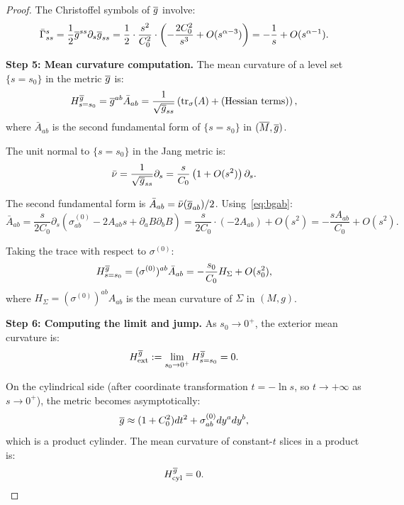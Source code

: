 \begin{proof}
The Christoffel symbols of $\overline{g}$ involve:
\begin{equation}\label{eq:Christoffel}
    \bar{\Gamma}^s_{ss} = \frac{1}{2}\overline{g}^{ss} \partial_s \overline{g}_{ss} = \frac{1}{2} \cdot \frac{s^2}{C_0^2} \cdot \left(-\frac{2C_0^2}{s^3} + O(s^{\alpha - 3})\right) = -\frac{1}{s} + O(s^{\alpha - 1}).
\end{equation}

\textbf{Step 5: Mean curvature computation.}
The mean curvature of a level set $\{s = s_0\}$ in the metric $\overline{g}$ is:
\begin{equation}\label{eq:MeanCurvatureDef}
    H^{\overline{g}}_{s=s_0} = \overline{g}^{ab} \bar{A}_{ab} = \frac{1}{\sqrt{\overline{g}_{ss}}} \left( \mathrm{tr}_\sigma(A) + \text{(Hessian terms)} \right),
\end{equation}
where $\bar{A}_{ab}$ is the second fundamental form of $\{s = s_0\}$ in $(\overline{M}, \overline{g})$.

The unit normal to $\{s = s_0\}$ in the Jang metric is:
\begin{equation}\label{eq:UnitNormal}
    \bar{\nu} = \frac{1}{\sqrt{\overline{g}_{ss}}} \partial_s = \frac{s}{C_0} \left(1 + O(s^2)\right) \partial_s.
\end{equation}

The second fundamental form is $\bar{A}_{ab} = \bar{\nu}(\overline{g}_{ab})/2$. Using~\eqref{eq:bgab}:
\begin{equation}\label{eq:SecondFF}
    \bar{A}_{ab} = \frac{s}{2C_0} \partial_s \left(\sigma_{ab}^{(0)} - 2A_{ab} s + \partial_a B \partial_b B\right) = \frac{s}{2C_0} \cdot (-2A_{ab}) + O(s^2) = -\frac{s A_{ab}}{C_0} + O(s^2).
\end{equation}

Taking the trace with respect to $\sigma^{(0)}$:
\begin{equation}\label{eq:MeanCurvatureTrace}
    H^{\overline{g}}_{s=s_0} = (\sigma^{(0)})^{ab} \bar{A}_{ab} = -\frac{s_0}{C_0} H_\Sigma + O(s_0^2),
\end{equation}
where $H_\Sigma = (\sigma^{(0)})^{ab} A_{ab}$ is the mean curvature of $\Sigma$ in $(M, g)$.

\textbf{Step 6: Computing the limit and jump.}
As $s_0 \to 0^+$, the exterior mean curvature is:
\begin{equation}\label{eq:ExteriorMC}
    H^{\overline{g}}_{\text{ext}} := \lim_{s_0 \to 0^+} H^{\overline{g}}_{s=s_0} = 0.
\end{equation}

On the cylindrical side (after coordinate transformation $t = -\ln s$, so $t \to +\infty$ as $s \to 0^+$), the metric becomes asymptotically:
\begin{equation}\label{eq:CylindricalMetric}
    \overline{g} \approx (1 + C_0^2) dt^2 + \sigma^{(0)}_{ab} dy^a dy^b,
\end{equation}
which is a product cylinder. The mean curvature of constant-$t$ slices in a product is:
\begin{equation}\label{eq:CylindricalMC}
    H^{\overline{g}}_{\text{cyl}} = 0.
\end{equation}


\end{proof}
